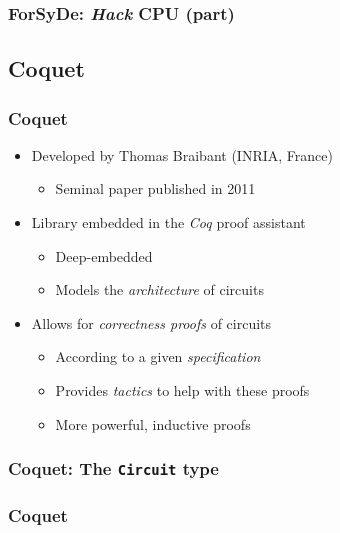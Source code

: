         \begin{frame}
            \frametitle{ForSyDe: \emph{Hack} CPU (part)}
        \end{frame}


    \subsection{Coquet}
    \label{subsec:coquet}
        \begin{frame}
            \frametitle{Coquet}

            \begin{itemize}
                \item Developed by Thomas Braibant (INRIA, France)
                    \begin{itemize}
                        \item Seminal paper published in 2011
                    \end{itemize}
                \item Library embedded in the \emph{Coq} proof assistant
                    \begin{itemize}
                        \item Deep-embedded
                        \item Models the \emph{architecture} of circuits
                    \end{itemize}
                \item Allows for \emph{correctness proofs} of circuits
                    \begin{itemize}
                        \item According to a given \emph{specification}
                        \item Provides \emph{tactics} to help with these proofs
                        \item More powerful, inductive proofs
                    \end{itemize}
            \end{itemize}
        \end{frame}

        \begin{frame}
            \frametitle{Coquet: The \texttt{Circuit} type}
        \end{frame}

        \begin{frame}
            \frametitle{Coquet}
        \end{frame}

